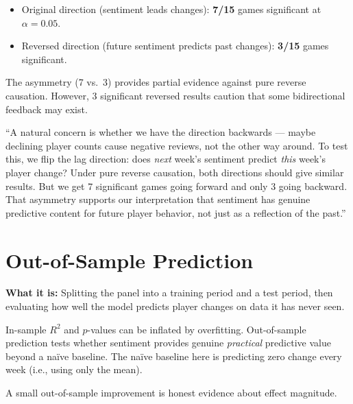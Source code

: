 \documentclass[11pt, letterpaper]{article}
\theoremstyle{definition}
\begin{document}
\begin{resultbox}
\begin{itemize}[nosep]
    \item Original direction (sentiment leads changes): \textbf{7/15} games significant at $\alpha = 0.05$.
    \item Reversed direction (future sentiment predicts past changes): \textbf{3/15} games significant.
\end{itemize}
The asymmetry (7 vs.\ 3) provides partial evidence against pure reverse causation.
However, 3 significant reversed results caution that some bidirectional feedback may exist.
\end{resultbox}

\begin{speakerbox}
``A natural concern is whether we have the direction backwards --- maybe declining player counts cause negative reviews, not the other way around.
To test this, we flip the lag direction: does \emph{next} week's sentiment predict \emph{this} week's player change?
Under pure reverse causation, both directions should give similar results.
But we get 7 significant games going forward and only 3 going backward.
That asymmetry supports our interpretation that sentiment has genuine predictive content for future player behavior, not just as a reflection of the past.''
\end{speakerbox}

\section{Out-of-Sample Prediction}

\textbf{What it is:} Splitting the panel into a training period and a test period, then evaluating how well the model predicts player changes on data it has never seen.

\begin{whybox}
In-sample $R^2$ and $p$-values can be inflated by overfitting.
Out-of-sample prediction tests whether sentiment provides genuine \emph{practical} predictive value beyond a naïve baseline.
The naïve baseline here is predicting zero change every week (i.e., using only the mean).

A small out-of-sample improvement is honest evidence about effect magnitude.
\end{whybox}
\end{document}
